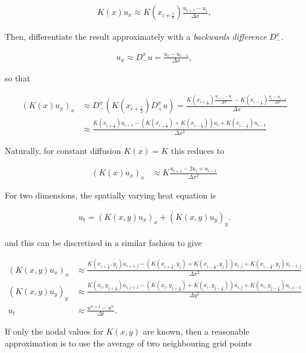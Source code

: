 \documentclass[11pt,a4paper,noindent]{article}
\begin{document}
\begin{align}
K(x) u_x \approx K(x_{i+\frac{1}{2}}) \frac{u_{i+1}-u_{i}}{\Delta x},
\end{align}

Then, differentiate the result approximately with a \emph{backwards difference} $D_-^x$. 

\begin{align}
u_x \approx D_-^x u = \frac{u_{i}-u_{i-1}}{\Delta x},
\end{align}

so that

\begin{align}
(K(x) u_x)_x &\approx D_-^x(K(x_{i+\frac{1}{2}}) D_+^xu) = \frac{K(x_{i+\frac{1}{2}})\frac{u_{i+1}-u_{i}}{\Delta x} - K(x_{i-\frac{1}{2}})\frac{u_{i}-u_{i-1}}{\Delta x}}{\Delta x} \\
&\approx \frac{ K(x_{i+\frac{1}{2}}) u_{i+1} - 
			    (K(x_{i+\frac{1}{2}})+K(x_{i-\frac{1}{2}}))u_{i} + 								K(x_{i-\frac{1}{2}}) u_{i-1} }{\Delta x^2}
\end{align}

Naturally, for constant diffusion $K(x)=K$ this reduces to 

\begin{align}
(K(x) u_x)_x &\approx K \frac{ u_{i+1} - 2 u_{i} + u_{i-1} }{\Delta x^2}
\end{align}

For two dimensions, the spatially varying heat equation is

\begin{align}
u_t = (K(x,y) u_x)_x + (K(x,y) u_y)_y.
\end{align}

and this can be discretized in a similar fashion to give 

\begin{align}
(K(x,y) u_x)_x &\approx \frac{ K(x_{i+\frac{1}{2}},y_j) u_{i+1,j} - 
			    (K(x_{i+\frac{1}{2}},y_j)+K(x_{i-\frac{1}{2}},y_j))u_{i,j} + 								K(x_{i-\frac{1}{2}},y_j) u_{i-1,j} }{\Delta x^2} \\
(K(x,y) u_y)_y &\approx \frac{ K(x_{i},y_{j+\frac{1}{2}}) u_{i,j+1} - 
			    (K(x_{i},y_{j+\frac{1}{2}})+K(x_{i},y_{j-\frac{1}{2}}))u_{i,j} + 								K(x_{i},y_{j-\frac{1}{2}}) u_{i,j-1} }{\Delta y^2} \\
u_t &\approx \frac{u^{n+1} - u^n}{\Delta t}.
\end{align}

If only the nodal values for $K(x,y)$ are known, then a reasonable approximation is to use the average of two neighbouring grid points
\end{document}
